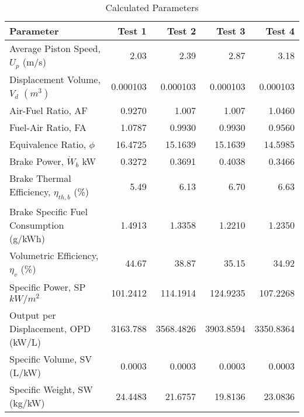 \documentclass{article}
\begin{document}
\begin{table}[ht]
    \centering
    \begin{tabular}{|l|r|r|r|r|}
    \hline
    Parameter & Test 1 & Test 2 & Test 3 & Test 4 \\
    \hline
    Average Piston Speed, $U_p$ (m/s) & 2.03 & 2.39 & 2.87 & 3.18 \\
    \hline
    Displacement Volume, $V_d$ $(m^3)$ & 0.000103 & 0.000103 & 0.000103 & 0.000103  \\
    \hline
    Air-Fuel Ratio, AF & 0.9270 & 1.007 & 1.007 & 1.0460 \\
    \hline
    Fuel-Air Ratio, FA & 1.0787 & 0.9930 & 0.9930 & 0.9560\\
    \hline
    Equivalence Ratio, $\phi$ & 16.4725 & 15.1639 & 15.1639 & 14.5985\\
    \hline
    Brake Power, $\dot W_b$ kW & 0.3272 & 0.3691 & 0.4038 & 0.3466 \\
    \hline
    Brake Thermal Efficiency, $\eta_{th,b}$ (\%) & 5.49 & 6.13 & 6.70 & 6.63\\
    \hline
    Brake Specific Fuel Consumption (g/kWh) & 1.4913 & 1.3358 & 1.2210 & 1.2350\\
    \hline
    Volumetric Efficiency, $\eta_{v}$ (\%) & 44.67 & 38.87 & 35.15 & 34.92\\
    \hline
    Specific Power, SP $kW/m^2$ & 101.2412 & 114.1914 & 124.9235 & 107.2268\\
    \hline
    Output per Displacement, OPD (kW/L) & 3163.788 & 3568.4826 & 3903.8594 & 3350.8364\\
    \hline
    Specific Volume, SV (L/kW) & 0.0003 & 0.0003 & 0.0003 & 0.0003\\
    \hline
    Specific Weight, SW (kg/kW) & 24.4483 & 21.6757 & 19.8136 & 23.0836\\
    \hline
    \end{tabular}
    \caption{Calculated Parameters}
    \label{tab:my_label}
\end{table}
\end{document}
